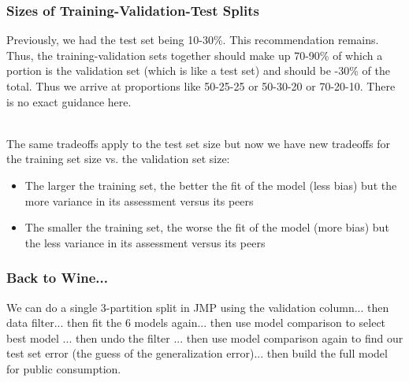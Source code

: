 \documentclass[handout]{beamer}
\begin{document}
\begin{frame}\frametitle{Sizes of Training-Validation-Test Splits}

Previously, we had the test set being 10-30\%. This recommendation remains. Thus, the training-validation sets together should make up 70-90\% of which a portion is the validation set \pause (which is like a test set) and should be -30\% of the total. \pause Thus we arrive at proportions like 50-25-25 or 50-30-20 or 70-20-10. \pause There is no exact guidance here. \\~\\ \pause

The same tradeoffs apply to the test set size but now we have new tradeoffs for the training set size vs. the validation set size:

\begin{itemize}
\item The larger the training set, \pause the better the fit of the model (less bias) but the more variance in its assessment versus its peers
\item The smaller the training set, \pause the worse the fit of the model (more bias) but the less variance in its assessment versus its peers
\end{itemize}
	
\end{frame}

\begin{frame}\frametitle{Back to Wine...}

We can do a single 3-partition split in JMP using the validation column... then data filter... then fit the 6 models again... then use model comparison to select best model ... then undo the filter ... then use model comparison again to find our test set error (the guess of the generalization error)... then build the full model for public consumption.
	
\end{frame}
\end{document}
